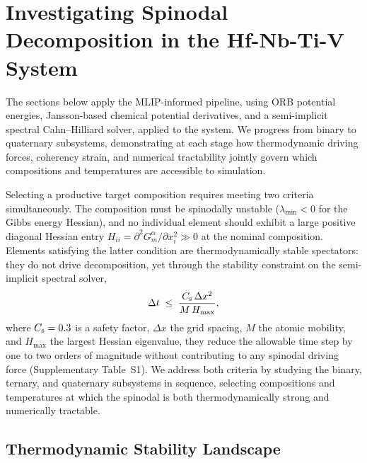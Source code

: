 \clearpage
\section{Investigating Spinodal Decomposition in the Hf-Nb-Ti-V System}

The sections below apply the MLIP-informed pipeline, using ORB potential energies, Jansson-based chemical potential derivatives, and a semi-implicit spectral Cahn--Hilliard solver, applied to the  system.
We progress from binary to quaternary subsystems, demonstrating at each stage how thermodynamic driving forces, coherency strain, and numerical tractability jointly govern which compositions and temperatures are accessible to simulation.

Selecting a productive target composition requires meeting two criteria simultaneously.
The composition must be spinodally unstable ($\lambda_{\min} < 0$ for the Gibbs energy Hessian), and no individual element should exhibit a large positive diagonal Hessian entry $H_{ii} = \partial^2 G^\alpha_m / \partial x_i^2 \gg 0$ at the nominal composition.
Elements satisfying the latter condition are thermodynamically stable spectators: they do not drive decomposition, yet through the stability constraint on the semi-implicit spectral solver,
\begin{equation}
    \Delta t \;\leq\; \frac{C_{\rm s}\,\Delta x^{2}}{M\,H_{\max}},
    \label{eq:dt_stability}
\end{equation}
where $C_{\rm s} = 0.3$ is a safety factor, $\Delta x$ the grid spacing, $M$ the atomic mobility, and $H_{\max}$ the largest Hessian eigenvalue, they reduce the allowable time step by one to two orders of magnitude without contributing to any spinodal driving force (Supplementary Table~S1).
We address both criteria by studying the binary, ternary, and quaternary subsystems in sequence, selecting compositions and temperatures at which the spinodal is both thermodynamically strong and numerically tractable.

\subsection{Thermodynamic Stability Landscape}
\label{sec:stability_landscape}

